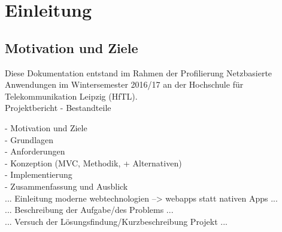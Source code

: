 \chapter{Einleitung}
\section{Motivation und Ziele}
\label{sec_einleitung_motivation-ziele}

Diese Dokumentation entstand im Rahmen der Profilierung \glqq{}Netzbasierte Anwendungen\grqq{} im Wintersemester 2016/17 an der Hochschule für Telekommunikation Leipzig (HfTL). \\


Projektbericht - Bestandteile

- Motivation und Ziele\\
- Grundlagen \\
- Anforderungen \\  
- Konzeption (MVC, Methodik, + Alternativen) \\
- Implementierung \\
- Zusammenfassung und Ausblick \\


... Einleitung moderne webtechnologien --> webapps statt nativen Apps ... \\
... Beschreibung der Aufgabe/des Problems ...\\

... Versuch der Lösungsfindung/Kurzbeschreibung Projekt ... \\

